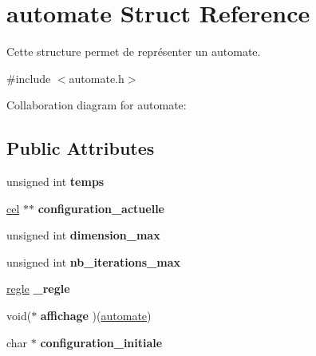 \hypertarget{structautomate}{}\section{automate Struct Reference}
\label{structautomate}


Cette structure permet de représenter un automate.  




{\ttfamily \#include $<$automate.\+h$>$}



Collaboration diagram for automate\+:
\subsection*{Public Attributes}
\begin{DoxyCompactItemize}
\item 
\mbox{\label{structautomate_acd8db0ae22d81e76231caa704b1b1772}} 
unsigned int {\bfseries temps}
\item 
\mbox{\label{structautomate_a04efa82bafedbc910965ca41c0ffceb1}} 
\hyperlink{structcellule}{cel} $\ast$$\ast$ {\bfseries configuration\+\_\+actuelle}
\item 
\mbox{\label{structautomate_a5fc5a034eea38f8ee798237e64528013}} 
unsigned int {\bfseries dimension\+\_\+max}
\item 
\mbox{\label{structautomate_a0c74b4e7059210c328cb56b19d8e76cc}} 
unsigned int {\bfseries nb\+\_\+iterations\+\_\+max}
\item 
\mbox{\label{structautomate_a00e06d1492bcdbfab74e8614993b9d7e}} 
\hyperlink{structregle}{regle} {\bfseries \+\_\+regle}
\item 
\mbox{\label{structautomate_a5f0dc5dc52d7b220eb216792bf7764c5}} 
void($\ast$ {\bfseries affichage} )(\hyperlink{structautomate}{automate})
\item 
\mbox{\label{structautomate_ae84af55cf081b599acce8f512ec66ddf}} 
char $\ast$ {\bfseries configuration\+\_\+initiale}
\end{DoxyCompactItemize}


